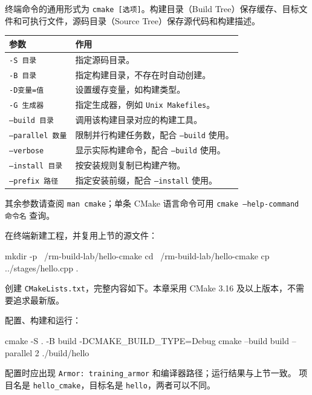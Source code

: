 终端命令的通用形式为 \texttt{cmake [选项]}。构建目录（Build Tree）保存缓存、目标文件和可执行文件，源码目录（Source Tree）保存源代码和构建描述。
\begin{center}
\begin{tabular}{p{}p{}}
\toprule[1.5pt]
参数 & 作用 \\
\midrule[1pt]
\texttt{-S 目录} & 指定源码目录。\\
\texttt{-B 目录} & 指定构建目录，不存在时自动创建。\\
\texttt{-D变量=值} & 设置缓存变量，如构建类型。\\
\texttt{-G 生成器} & 指定生成器，例如 \texttt{Unix Makefiles}。\\
\texttt{--build 目录} & 调用该构建目录对应的构建工具。\\
\texttt{--parallel 数量} & 限制并行构建任务数，配合 \texttt{--build} 使用。\\
\texttt{--verbose} & 显示实际构建命令，配合 \texttt{--build} 使用。\\
\texttt{--install 目录} & 按安装规则复制已构建产物。\\
\texttt{--prefix 路径} & 指定安装前缀，配合 \texttt{--install} 使用。\\
\bottomrule[1.5pt]
\end{tabular}
\end{center}
其余参数请查阅 \texttt{man cmake}；单条 CMake 语言命令可用 \texttt{cmake --help-command 命令名} 查询。

\begin{example}[先跑通一个最小工程]
在终端新建工程，并复用上节的源文件：
\begin{tbash}
mkdir -p ~/rm-build-lab/hello-cmake
cd ~/rm-build-lab/hello-cmake
cp ../stages/hello.cpp .
\end{tbash}
创建 \texttt{CMakeLists.txt}，完整内容如下。本章采用 CMake 3.16 及以上版本，不需要追求最新版。


配置、构建和运行：
\begin{tbash}
cmake -S . -B build -DCMAKE_BUILD_TYPE=Debug
cmake --build build --parallel 2
./build/hello
\end{tbash}
配置时应出现 \texttt{Armor: training\_armor} 和编译器路径；运行结果与上节一致。
项目名是 \texttt{hello\_cmake}，目标名是 \texttt{hello}，两者可以不同。
\end{example}


